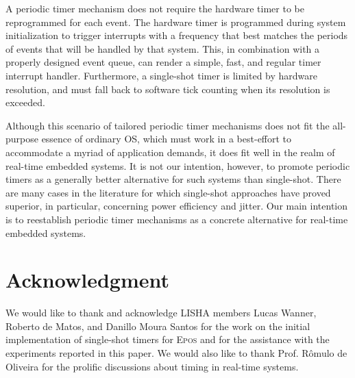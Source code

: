 \documentclass[final,3pd,times]{elsarticle}
\begin{document}
A periodic timer mechanism does not require the hardware timer to be
reprogrammed for each event. The hardware timer is programmed during
system initialization to trigger interrupts with a frequency that best
matches the periods of events that will be handled by that system. This,
in combination with a properly designed event queue, can render a
simple, fast, and regular timer interrupt handler.  Furthermore, a
single-shot timer is limited by hardware resolution, and must fall back
to software tick counting when its resolution is exceeded.

Although this scenario of tailored periodic timer mechanisms does not
fit the all-purpose essence of ordinary OS, which must work in a
best-effort to accommodate a myriad of application demands, it does fit
well in the realm of real-time embedded systems. It is not our
intention, however, to promote periodic timers as a generally better
alternative for such systems than single-shot.  There are many cases in
the literature for which single-shot approaches have proved superior, in
particular, concerning power efficiency and jitter. Our main intention
is to reestablish periodic timer mechanisms as a concrete alternative
for real-time embedded systems.

\section*{Acknowledgment}\label{sec:ack}

We would like to thank and acknowledge LISHA members Lucas Wanner,
Roberto de Matos, and Danillo Moura Santos for the work on the initial
implementation of single-shot timers for \textsc{Epos} and for the
assistance with the experiments reported in this paper. We would also
like to thank Prof. R\^{o}mulo de Oliveira for the prolific discussions
about timing in real-time systems.







\end{document}
